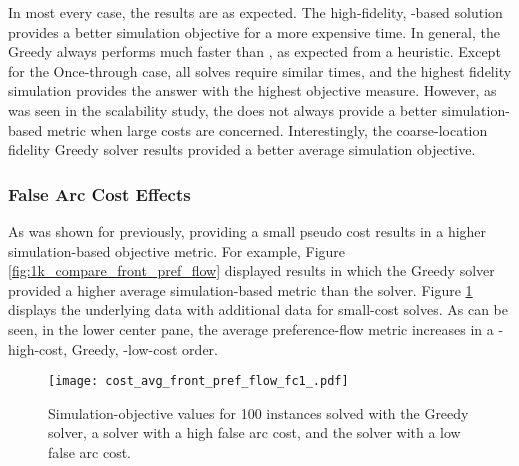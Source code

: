 In most every case, the results are as expected. The high-fidelity, \cbc-based
solution provides a better simulation objective for a more expensive time. In
general, the Greedy always performs much faster than \cbc, as expected from a
heuristic. Except for the Once-through case, all \cbc solves require similar
times, and the highest fidelity simulation provides the answer with the highest
objective measure. However, as was seen in the scalability study, the \cbc does
not always provide a better simulation-based metric when large costs are
concerned. Interestingly, the coarse-location fidelity Greedy solver results
provided a better average simulation objective.

\subsubsection{False Arc Cost Effects}

As was shown for previously, providing a small pseudo cost results in a higher
simulation-based objective metric. For example, Figure
\ref{fig:1k_compare_front_pref_flow} displayed results in which the Greedy
solver provided a higher average simulation-based metric than the \cbc
solver. Figure \ref{fig:cost_avg_front_pref_flow_fc1_} displays the underlying
data with additional data for small-cost \cbc solves. As can be seen, in the
lower center pane, the average preference-flow metric increases in a
\cbc-high-cost, Greedy, \cbc-low-cost order.

\begin{figure}[h!]
  \begin{center}
    \texttt{[image: cost\_avg\_front\_pref\_flow\_fc1\_.pdf]}
    \caption{
      \label{fig:cost_avg_front_pref_flow_fc1_}
      Simulation-objective values for 100 instances solved with the Greedy
      solver, a \cbc solver with a high false arc cost, and the \cbc solver with a
      low false arc cost.}
  \end{center}
\end{figure}




